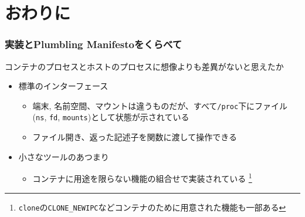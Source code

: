 \documentclass[unicode, 14pt, aspectratio=169]{beamer}
\begin{document}
\section{おわりに}
\begin{frame}
  \frametitle{実装とPlumbling Manifestoをくらべて}
  コンテナのプロセスとホストのプロセスに想像よりも差異がないと思えたか
  \begin{itemize}[leftmargin=0.8cm,label=$\circ$]
  \item 標準のインターフェース
    \begin{itemize}[leftmargin=0.8cm,label=$\circ$]
    \item 端末, 名前空間、マウントは違うものだが、すべて\texttt{/proc}下にファイル(\texttt{ns}, \texttt{fd}, \texttt{mounts})として状態が示されている
    \item ファイル開き、返った記述子を関数に渡して操作できる
    \end{itemize}
  \item 小さなツールのあつまり
    \begin{itemize}
      \item コンテナに用途を限らない機能の組合せで実装されている
      \footnote{\texttt{clone}の\texttt{CLONE\_NEWIPC}などコンテナのために用意された機能も一部ある}
    \end{itemize}
  \end{itemize}
  
\end{frame}
\end{document}
